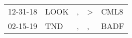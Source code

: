 \begin{supertabular}{lllll}
 12-31-18 &  LOOK &  , &  \textgreater &  CML8 \\
 02-15-19 &   TND &  , &             , &  BADF \\
\end{supertabular}
